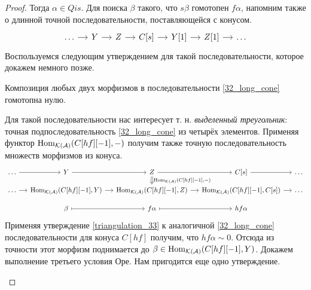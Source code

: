\documentclass[../main.tex]{subfiles}
\begin{document}
\begin{proof}
Тогда $\alpha \in Qis$. Для поиска $\beta$ такого, что $s\beta$ гомотопен $f\alpha$, напомним также о длинной точной последовательности, поставляющейся с конусом.
    \begin{equation}\label{32_long_cone}
        \begin{tikzcd}[sep=small]
	\ldots&Y&Z& {C[s]} & Y[1]&Z[1]&\ldots
	\arrow[from=1-2, to=1-3]
	\arrow[from=1-3, to=1-4]
 \arrow[from=1-1, to=1-2]
 \arrow[from=1-4, to=1-5]
 \arrow[from=1-5, to=1-6]
 \arrow[from=1-6, to=1-7]
\end{tikzcd}
    \end{equation}
Воспользуемся следующим утверждением для такой последовательности, которое докажем немного позже.

\begin{to_lem}\label{triangulation_33}
Композиция любых двух морфизмов в последовательности \eqref{32_long_cone} гомотопна нулю.
\end{to_lem}
Для такой последовательности нас интересует т. н. \emph{выделенный треугольник}: точная подпоследовательность \eqref{32_long_cone} из четырёх элементов. Применяя функтор $\operatorname{Hom}_{\mathcal{K}(\mathcal{A})}(C[hf][-1], -)$ получим также точную последовательность множеств морфизмов из конуса.
    \begin{equation*}
       \begin{tikzcd}[sep=small]
	\ldots & Y & Z & {C[s]} & \ldots \\
	\ldots & {\Hom_{\mathcal{K}(\mathcal{A})}(C[hf][-1], Y)} & {\Hom_{\mathcal{K}(\mathcal{A})}(C[hf][-1], Z)} & {\Hom_{\mathcal{K}(\mathcal{A})}(C[hf][-1], C[s])} & \ldots \\
	& \beta & f\alpha & hf\alpha
	\arrow[from=1-2, to=1-3]
	\arrow[from=1-3, to=1-4]
	\arrow["{\Hom_{\mathcal{K}(\mathcal{A})}(C[hf][-1], -)}", Rightarrow, from=1-3, to=2-3]
	\arrow[from=2-2, to=2-3]
	\arrow[from=2-3, to=2-4]
	\arrow[maps to, from=3-3, to=3-4]
	\arrow[maps to, from=3-2, to=3-3]
	\arrow[from=1-4, to=1-5]
	\arrow[from=1-1, to=1-2]
	\arrow[from=2-1, to=2-2]
	\arrow[from=2-4, to=2-5]
\end{tikzcd}
    \end{equation*}
Применяя утверждение \ref{triangulation_33} к аналогичной \eqref{32_long_cone} последовательности для конуса $C[hf]$ получим, что $hf\alpha \sim 0$. Отсюда из точности этот морфизм поднимается до $\beta \in \operatorname{Hom}_{\mathcal{K}(\mathcal{A})}(C[hf][-1], Y)$.
Докажем выполнение третьего условия Оре. Нам пригодится еще одно утверждение.
\begin{to_lem}\label{32_additive_loc}

\end{to_lem}
\end{proof}
\end{document}
